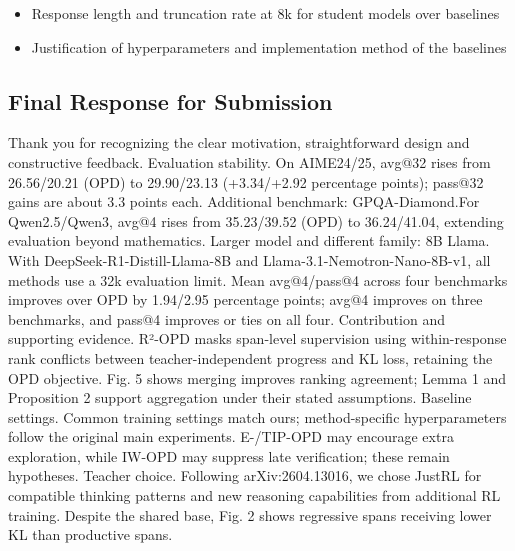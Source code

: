 \begin{itemize}
\item Response length and truncation rate at 8k for student models over baselines
\par{}
\begin{responsebox}[frametitle={Response to Q3}]
\vspace*{2\baselineskip}
\end{responsebox}

\item Justification of hyperparameters and implementation method of the baselines
\par{}
\begin{responsebox}[frametitle={Response to Q4}]
\vspace*{2\baselineskip}
\end{responsebox}

\end{itemize}

\par{}
\subsection*{Final Response for Submission}
\par{}
\begin{responsebox}[frametitle={Final Response to Reviewer 1 (gURK)},linecolor=finalgreen,backgroundcolor=finalfill]

Thank you for recognizing the clear motivation, straightforward design and constructive feedback.
Evaluation stability. On AIME24/25, avg@32 rises from 26.56/20.21 (OPD) to 29.90/23.13 (+3.34/+2.92 percentage points); pass@32 gains are about 3.3 points each.
Additional benchmark: GPQA-Diamond.For Qwen2.5/Qwen3, avg@4 rises from 35.23/39.52 (OPD) to 36.24/41.04, extending evaluation beyond mathematics.
Larger model and different family: 8B Llama. With DeepSeek-R1-Distill-Llama-8B and Llama-3.1-Nemotron-Nano-8B-v1, all methods use a 32k evaluation limit. Mean avg@4/pass@4 across four benchmarks improves over OPD by 1.94/2.95 percentage points; avg@4 improves on three benchmarks, and pass@4 improves or ties on all four.
Contribution and supporting evidence. R²-OPD masks span-level supervision using within-response rank conflicts between teacher-independent progress and KL loss, retaining the OPD objective. Fig. 5 shows merging improves ranking agreement; Lemma 1 and Proposition 2 support aggregation under their stated assumptions.
Baseline settings. Common training settings match ours; method-specific hyperparameters follow the original main experiments. E-/TIP-OPD may encourage extra exploration, while IW-OPD may suppress late verification; these remain hypotheses.
Teacher choice. Following arXiv:2604.13016, we chose JustRL for compatible thinking patterns and new reasoning capabilities from additional RL training. Despite the shared base, Fig. 2 shows regressive spans receiving lower KL than productive spans.

\end{responsebox}

